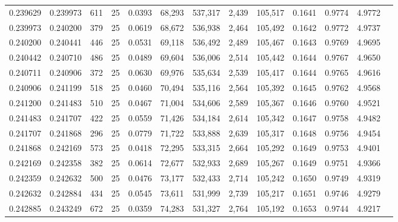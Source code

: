 \begin{tabular}{rrrrrrrrrrrrr}
0.239629 & 0.239973 &   611 &  25 &                                     0.0393 &  68,293 & 537,317 &   2,439 & 105,517 & 0.1641 & 0.9774 & 4.9772 \\
0.239973 & 0.240200 &   379 &  25 &                                     0.0619 &  68,672 & 536,938 &   2,464 & 105,492 & 0.1642 & 0.9772 & 4.9737 \\
0.240200 & 0.240441 &   446 &  25 &                                     0.0531 &  69,118 & 536,492 &   2,489 & 105,467 & 0.1643 & 0.9769 & 4.9695 \\
0.240442 & 0.240710 &   486 &  25 &                                     0.0489 &  69,604 & 536,006 &   2,514 & 105,442 & 0.1644 & 0.9767 & 4.9650 \\
0.240711 & 0.240906 &   372 &  25 &                                     0.0630 &  69,976 & 535,634 &   2,539 & 105,417 & 0.1644 & 0.9765 & 4.9616 \\
0.240906 & 0.241199 &   518 &  25 &                                     0.0460 &  70,494 & 535,116 &   2,564 & 105,392 & 0.1645 & 0.9762 & 4.9568 \\
0.241200 & 0.241483 &   510 &  25 &                                     0.0467 &  71,004 & 534,606 &   2,589 & 105,367 & 0.1646 & 0.9760 & 4.9521 \\
0.241483 & 0.241707 &   422 &  25 &                                     0.0559 &  71,426 & 534,184 &   2,614 & 105,342 & 0.1647 & 0.9758 & 4.9482 \\
0.241707 & 0.241868 &   296 &  25 &                                     0.0779 &  71,722 & 533,888 &   2,639 & 105,317 & 0.1648 & 0.9756 & 4.9454 \\
0.241868 & 0.242169 &   573 &  25 &                                     0.0418 &  72,295 & 533,315 &   2,664 & 105,292 & 0.1649 & 0.9753 & 4.9401 \\
0.242169 & 0.242358 &   382 &  25 &                                     0.0614 &  72,677 & 532,933 &   2,689 & 105,267 & 0.1649 & 0.9751 & 4.9366 \\
0.242359 & 0.242632 &   500 &  25 &                                     0.0476 &  73,177 & 532,433 &   2,714 & 105,242 & 0.1650 & 0.9749 & 4.9319 \\
0.242632 & 0.242884 &   434 &  25 &                                     0.0545 &  73,611 & 531,999 &   2,739 & 105,217 & 0.1651 & 0.9746 & 4.9279 \\
0.242885 & 0.243249 &   672 &  25 &                                     0.0359 &  74,283 & 531,327 &   2,764 & 105,192 & 0.1653 & 0.9744 & 4.9217 \\

\end{tabular}
